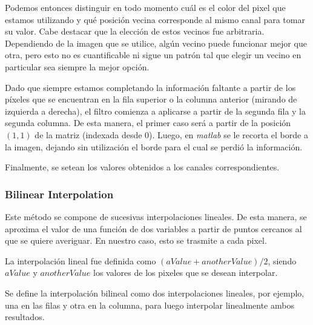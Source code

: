 \vspace{\baselineskip}

Podemos entonces distinguir en todo momento cuál es el color del pixel que estamos utilizando y qué posición vecina corresponde al mismo canal para tomar su valor. Cabe destacar que la elección de estos vecinos fue arbitraria. Dependiendo de la imagen que se utilice, algún vecino puede funcionar mejor que otra, pero esto no es cuantificable ni sigue un patrón tal que elegir un vecino en particular sea siempre la mejor opción.

\vspace{\baselineskip}

Dado que siempre estamos completando la información faltante a partir de los píxeles que se encuentran en la fila superior o la columna anterior (mirando de izquierda a derecha), el filtro comienza a aplicarse a partir de la segunda fila y la segunda columna. De esta manera, el primer caso será a partir de la posición $(1,1)$ de la matriz (indexada desde 0). Luego, en \textit{matlab} se le recorta el borde a la imagen, dejando sin utilización el borde para el cual se perdió la información.

\vspace{\baselineskip}

Finalmente, se setean los valores obtenidos a los canales correspondientes.



\subsubsection{Bilinear Interpolation}
Este método se compone de sucesivas interpolaciones lineales. De esta manera, se aproxima el valor de una función de dos variables a partir de puntos cercanos al que se quiere averiguar. En nuestro caso, esto se trasmite a cada pixel.  

\vspace{\baselineskip}

La interpolación lineal fue definida como \textit{$(aValue + anotherValue)/2$}, siendo $aValue$ y $anotherValue$ los valores de los pixeles que se desean interpolar. 

\vspace{\baselineskip}

Se define la interpolación bilineal como dos interpolaciones lineales, por ejemplo, una en las filas y otra en la columna, para luego interpolar linealmente ambos resultados. 

\vspace{\baselineskip}


